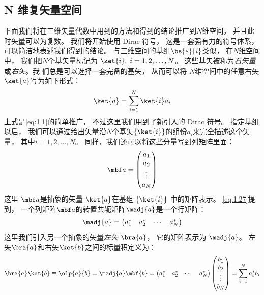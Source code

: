 \subsection{N 维复矢量空间}
\label{sec:1.1.4}
下面我们将在三维矢量代数中用到的方法和得到的结论推广到$N$维空间，
并且此时矢量可以为复数。
我们将开始使用 Dirac 符号，
这是一套强有力的符号体系，
可以简洁地表述我们得到的结论。
与三维空间的基组$\bs{e}{i}$类似，
在$N$维空间中，
我们把$N$个基矢量标记为 $\ket{i},\; i = 1, 2, \dots, N$。
这些基矢被称为\emph{右矢量}或\emph{右矢}。我
们总是可以选择一套完备的基矢，
从而可以将 $N$维空间中的任意右矢 $\ket{a}$写为如下形式：
\begin{equation}
 \ket{a} = \sum_{i=1}^{N} \ket{i} a_i
 \label{eq:1.41}
\end{equation}
上式是\autoref{eq:1.1}的简单推广，
不过这里我们用到了新引入的 Dirac 符号。
指定基组以后，
我们可以通过给出矢量沿$N$个基矢$\left\{\ket{i}\right\}$的组份$a_i$来完全描述这个矢量，
其中$i = 1, 2, \dots, N$。
同样，我们还可以将这些分量写到列矩阵里面：
\begin{equation}
 {\mbf a} = \begin{pmatrix}
     a_1 \\ a_2 \\ \vdots \\ a_N
 \end{pmatrix}
 \label{eq:1.42}
\end{equation}
这里 $\mbf a$是抽象的矢量 $\ket{a}$在基组 $\left\{\ket{i}\right\}$ 中的矩阵表示。
\autoref{eq:1.27}提到，
一个列矩阵$\mbf a$的转置共轭矩阵$\madj{a}$是一个行矩阵：
\begin{equation}
 \madj{a} = \begin{pmatrix}
     a_1^\ast & a_2^\ast &\cdots &a_N^\ast
 \end{pmatrix}
 \label{eq:1.43}
\end{equation}
这里我们引入另一个抽象的矢量\emph{左矢} $\bra{a}$，
它的矩阵表示为 $\madj{a}$。
左矢$\bra{a}$和右矢$\ket{b}$之间的标量积定义为：
\begin{equation}
 \bra{a}\ket{b} \equiv \olp{a}{b} = \madj{a}\mbf{b} = \begin{pmatrix}
     a_1^\ast & a_2^\ast &\cdots &a_N^\ast
 \end{pmatrix} \begin{pmatrix}
     b_1 \\ b_2 \\ \vdots \\ b_N
 \end{pmatrix} = \sum_{i=1}^N a_i^\ast b_i
 \label{eq:1.44}
\end{equation}
